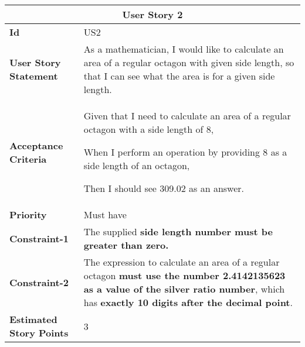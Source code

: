 \hspace{1cm}
\begin{center}
\begin{tabular}{ | m{2.3cm} | m{12cm} | } 

 \hline
 \multicolumn{2}{|c|}{\textbf{User Story 2}} \\

\hline
\textbf{Id} & US2 \\ 

\hline
\textbf{User Story Statement} &  As a mathematician, I would like to calculate an area of a regular octagon with given side length, so that I can see what the area is for a given side length.\\ 

\hline
\textbf{Acceptance Criteria} &  
Given that I need to calculate an area of a regular octagon with a side length of 8,

When I perform an operation by providing 8 as a side length of an octagon,

Then I should see 309.02 as an answer.\\ 

\hline
\textbf{Priority} & Must have \\ 

\hline
\textbf{Constraint-1} & The supplied \textbf{side length number must be greater than zero.} \\ 

\hline
\textbf{Constraint-2} & The expression to calculate an area of a regular octagon \textbf{must use the number 2.4142135623 as a value of the silver ratio number}, which has \textbf{exactly 10 digits after the decimal point}.\\ 

\hline
\textbf{Estimated Story Points} & 3 \\
\hline

\end{tabular}
\end{center}


